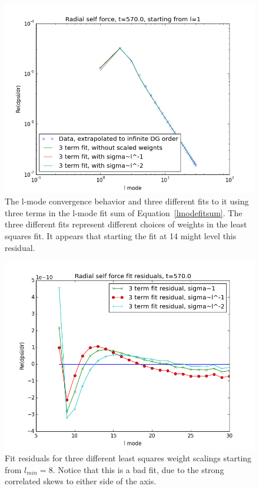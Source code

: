 \begin{figure}
  \includegraphics{fiterrscalecorrect3term570l1}
  \caption{The l-mode convergence behavior and three different fits to it using three terms in the l-mode fit sum of Equation~\ref{lmodefitsum}. The three different fits represent different choices of weights in the least squares fit. It appears that starting the fit at 14 might level this residual.}
\label{sigmafit}
\end{figure}

\begin{figure}
\includegraphics{fitresiduals3terms570l8}
\caption{Fit residuals for three different least squares weight scalings starting from $l_{min}=8$. Notice that this is a bad fit, due to the strong correlated skews to either side of the axis.}
\label{8badfit}
\end{figure}

